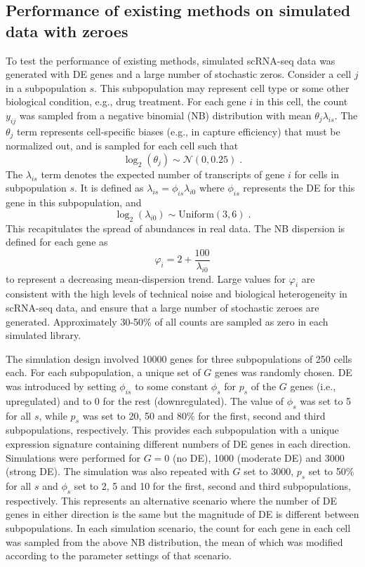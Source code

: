 \documentclass{article}
\begin{document}
\subsection{Performance of existing methods on simulated data with zeroes}
To test the performance of existing methods, simulated scRNA-seq data was generated with DE genes and a large number of stochastic zeros.
Consider a cell $j$ in a subpopulation $s$.
This subpopulation may represent cell type or some other biological condition, e.g., drug treatment. 
For each gene $i$ in this cell, the count $y_{ij}$ was sampled from a negative binomial (NB) distribution with mean $\theta_{j}\lambda_{is}$.
The $\theta_{j}$ term represents cell-specific biases (e.g., in capture efficiency) that must be normalized out, 
    and is sampled for each cell such that 
\[
\log_2(\theta_j) \sim \mathcal{N}(0, 0.25) \;.
\]
The $\lambda_{is}$ term denotes the expected number of transcripts of gene $i$ for cells in subpopulation $s$.
It is defined as $\lambda_{is}=\phi_{is}\lambda_{i0}$ where $\phi_{is}$ represents the DE for this gene in this subpopulation, and 
\[
\log_2(\lambda_{i0}) \sim \mbox{Uniform}(3, 6) \;.
\]
This recapitulates the spread of abundances in real data.
The NB dispersion is defined for each gene as 
\[
    \varphi_i = 2 + \frac{100}{\lambda_{i0}}
\]
to represent a decreasing mean-dispersion trend.
Large values for $\varphi_i$ are consistent with the high levels of technical noise and biological heterogeneity in scRNA-seq data,
    and ensure that a large number of stochastic zeroes are generated.
Approximately 30-50\% of all counts are sampled as zero in each simulated library.

The simulation design involved 10000 genes for three subpopulations of 250 cells each.
For each subpopulation, a unique set of $G$ genes was randomly chosen.
DE was introduced by setting $\phi_{is}$ to some constant $\phi_s$ for $p_s$ of the $G$ genes (i.e., upregulated) and to $0$ for the rest (downregulated).
The value of $\phi_s$ was set to 5 for all $s$, while $p_s$ was set to 20, 50 and 80\% for the first, second and third subpopulations, respectively.
This provides each subpopulation with a unique expression signature containing different numbers of DE genes in each direction.
Simulations were performed for $G = 0$ (no DE), 1000 (moderate DE) and 3000 (strong DE).
The simulation was also repeated with $G$ set to 3000, $p_s$ set to 50\% for all $s$ and $\phi_{s}$ set to 2, 5 and 10 for the first, second and third subpopulations, respectively.
This represents an alternative scenario where the number of DE genes in either direction is the same but the magnitude of DE is different between subpopulations.
In each simulation scenario, the count for each gene in each cell was sampled from the above NB distribution,
    the mean of which was modified according to the parameter settings of that scenario.
\end{document}
